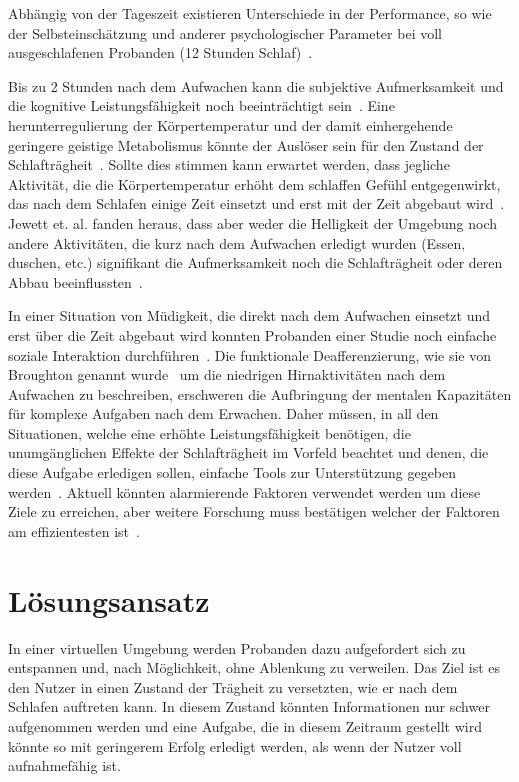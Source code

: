 \documentclass[a4paper, 11pt]{article}
\begin{document}
Abhängig von der Tageszeit existieren Unterschiede in der Performance, so wie der Selbsteinschätzung und anderer psychologischer Parameter bei voll ausgeschlafenen Probanden (12 Stunden Schlaf)~\cite{kraemer2000time}.

Bis zu 2 Stunden nach dem Aufwachen kann die subjektive Aufmerksamkeit und die kognitive Leistungsfähigkeit noch beeinträchtigt sein~\cite{jewett1999time}. Eine herunterregulierung der Körpertemperatur und der damit einhergehende geringere geistige Metabolismus könnte der Auslöser sein für den Zustand der Schlafträgheit~\cite{dinges1990you}. Sollte dies stimmen kann erwartet werden, dass jegliche Aktivität, die die Körpertemperatur erhöht dem schlaffen Gefühl entgegenwirkt, das nach dem Schlafen einige Zeit einsetzt und erst mit der Zeit abgebaut wird~\cite{jewett1999time}. Jewett et. al. fanden heraus, dass aber weder die Helligkeit der Umgebung noch andere Aktivitäten, die kurz nach dem Aufwachen erledigt wurden (Essen, duschen, etc.) signifikant die Aufmerksamkeit noch die Schlafträgheit oder deren Abbau beeinflussten~\cite{jewett1999time}.

In einer Situation von Müdigkeit, die direkt nach dem Aufwachen einsetzt und erst über die Zeit abgebaut wird konnten Probanden einer Studie noch einfache soziale Interaktion durchführen~\cite{dinges1990you}. Die funktionale Deafferenzierung, wie sie von Broughton genannt wurde~\cite{broughton1968sleep} um die niedrigen Hirnaktivitäten nach dem Aufwachen zu beschreiben, erschweren die Aufbringung der mentalen Kapazitäten für komplexe Aufgaben nach dem Erwachen. Daher müssen, in all den Situationen, welche eine erhöhte Leistungsfähigkeit benötigen, die unumgänglichen Effekte der Schlafträgheit im Vorfeld beachtet und denen, die diese Aufgabe erledigen sollen, einfache Tools zur Unterstützung gegeben werden~\cite{ferrara2000sleep}. Aktuell könnten alarmierende Faktoren verwendet werden um diese Ziele zu erreichen, aber weitere Forschung muss bestätigen welcher der Faktoren am effizientesten ist~\cite{ferrara2000sleep}.

\section*{Lösungsansatz}
In einer virtuellen Umgebung werden Probanden dazu aufgefordert sich zu entspannen und, nach Möglichkeit, ohne Ablenkung zu verweilen. Das Ziel ist es den Nutzer in einen Zustand der Trägheit zu versetzten, wie er nach dem Schlafen auftreten kann. In diesem Zustand könnten Informationen nur schwer aufgenommen werden und eine Aufgabe, die in diesem Zeitraum gestellt wird könnte so mit geringerem Erfolg erledigt werden, als wenn der Nutzer voll aufnahmefähig ist. 
\end{document}
